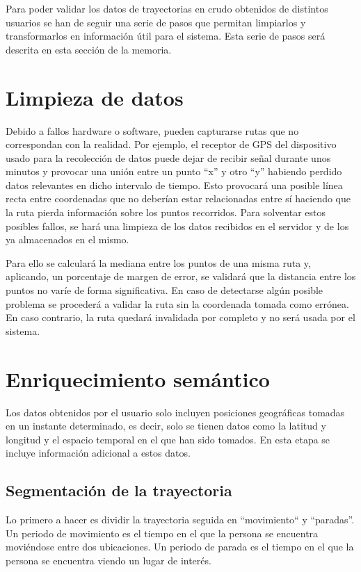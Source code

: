
Para poder validar los datos de trayectorias en crudo obtenidos de distintos usuarios se han de seguir una serie de pasos que permitan limpiarlos y transformarlos en información útil para el sistema. Esta serie de pasos será descrita en esta sección de la memoria.

\section{Limpieza de datos}

Debido a fallos hardware o software, pueden capturarse rutas que no correspondan con la realidad. Por ejemplo, el receptor de GPS del dispositivo usado para la recolección de datos puede dejar de recibir señal durante unos minutos y provocar una unión entre un punto ``x'' y otro ``y'' habiendo perdido datos relevantes en dicho intervalo de tiempo. Esto provocará una posible línea recta entre coordenadas que no deberían estar relacionadas entre sí haciendo que la ruta pierda información sobre los puntos recorridos. Para solventar estos posibles fallos, se hará una limpieza de los datos recibidos  en el servidor y de los ya almacenados en el mismo.

Para ello se calculará la mediana entre los puntos de una misma ruta y, aplicando, un porcentaje de margen de error, se validará que la distancia entre los puntos no varíe de forma significativa. En caso de detectarse algún posible problema se procederá a validar la ruta sin la coordenada tomada como errónea. En caso contrario, la ruta quedará invalidada por completo y no será usada por el sistema. 

\section{Enriquecimiento semántico}

Los datos obtenidos por el usuario solo incluyen posiciones geográficas tomadas en un instante determinado, es decir, solo se tienen datos como la latitud y longitud y el espacio temporal en el que han sido tomados. En esta etapa se incluye información adicional a estos datos.

\subsection{Segmentación de la trayectoria}

Lo primero a hacer es dividir la trayectoria seguida en ``movimiento`` y ``paradas''. Un periodo de movimiento es el tiempo en el que la persona se encuentra moviéndose entre dos ubicaciones. Un periodo de parada es el tiempo en el que la persona se encuentra viendo un lugar de interés.


